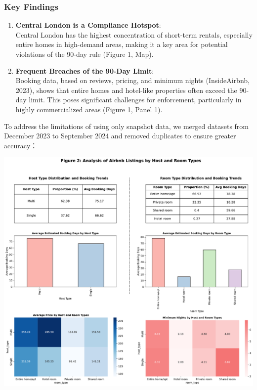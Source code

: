\documentclass[
  a4paper,
  DIV=11,
  numbers=noendperiod]{scrartcl}
\begin{document}
\subsubsection{Key Findings}\label{key-findings}

\begin{enumerate}
\def\labelenumi{\arabic{enumi}.}
\item
  \textbf{Central London is a Compliance Hotspot}:\\
  Central London has the highest concentration of short-term rentals,
  especially entire homes in high-demand areas, making it a key area for
  potential violations of the 90-day rule (Figure 1, Map).
\item
  \textbf{Frequent Breaches of the 90-Day Limit}:\\
  Booking data, based on reviews, pricing, and minimum nights
  (InsideAirbnb, 2023), shows that entire homes and hotel-like
  properties often exceed the 90-day limit. This poses significant
  challenges for enforcement, particularly in highly commercialized
  areas (Figure 1, Panel 1).
\end{enumerate}

To address the limitations of using only snapshot data, we merged
datasets from December 2023 to September 2024 and removed duplicates to
ensure greater accuracy：

\includegraphics{0013_Group_Work_files/figure-pdf/cell-9-output-1.pdf}
\end{document}
